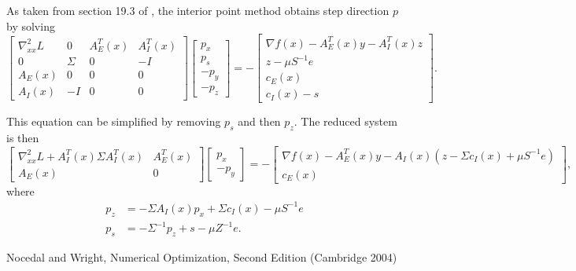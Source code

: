 \documentclass{article}
\begin{document}
As taken from section 19.3 of \cite{NW04}, 
    the interior point method obtains step direction $p$ by solving
\begin{equation}
\begin{bmatrix}
    \nabla^2_{xx}\mathit{L} & 0 & A_E^T(x) & A_I^T(x) \\
    0 & \Sigma & 0 & -I \\
    A_E(x) & 0 & 0 & 0 \\
    A_I(x) & -I & 0 & 0
\end{bmatrix}
\begin{bmatrix} p_x \\ p_s \\ -p_y \\ -p_z \end{bmatrix}
    = -
\begin{bmatrix}
    \nabla f(x) - A_E^T(x) y - A_I^T(x) z \\
    z - \mu S^{-1} e \\
    c_E(x) \\
    c_I(x) - s
\end{bmatrix}.
\end{equation}

This equation can be simplified by removing $p_s$ and then $p_z$.
The reduced system is then
\begin{equation}
\begin{bmatrix}
    \nabla^2_{xx}\mathit{L} + A_I^T(x) \Sigma A_I^T(x) & A_E^T(x) \\
    A_E(x) & 0 
\end{bmatrix}
\begin{bmatrix} p_x \\ -p_y \end{bmatrix}
    = -
\begin{bmatrix}
    \nabla f(x) - A_E^T(x) y - A_I(x) (z - \Sigma c_I(x) + \mu S^{-1} e) \\
    c_E(x)
\end{bmatrix},
\end{equation}
where
\begin{align}
    p_z &= -\Sigma A_I(x) p_x + \Sigma c_I(x) - \mu S^{-1} e \\
    p_s &= -\Sigma^{-1} p_z + s - \mu Z^{-1} e.
\end{align}


\begin{thebibliography}{99}
 Nocedal and Wright, 
    Numerical Optimization, Second Edition (Cambridge 2004)
\end{thebibliography}
\end{document}
